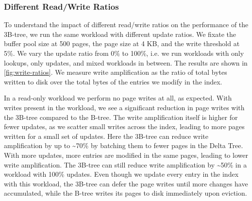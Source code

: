\subsubsection*{Different Read/Write Ratios}
To understand the impact of different read/write ratios on the performance of the 3B-tree, we run the same workload with different update ratios.
We fixate the buffer pool size at 500 pages, the page size at 4 KB, and the write threshold at 5\%.
We vary the update ratio from 0\% to 100\%, i.e. we run workloads with only lookups, only updates, and mixed workloads in between.
The results are shown in \autoref{fig:write-ratios}.
We measure write amplification as the ratio of total bytes written to disk over the total bytes of the entries we modify in the index.

In a read-only workload we perform no page writes at all, as expected.
With writes present in the workload, we see a significant reduction in page writes with the 3B-tree compared to the B-tree.
The write amplification itself is higher for fewer updates, as we scatter small writes across the index, leading to more pages written for a small set of updates.
Here the 3B-tree can reduce write amplification by up to \textasciitilde70\% by batching them to fewer pages in the Delta Tree.
With more updates, more entries are modified in the same pages, leading to lower write amplification.
The 3B-tree can still reduce write amplification by \textasciitilde50\% in a workload with 100\% updates.
Even though we update every entry in the index with this workload, the 3B-tree can defer the page writes until more changes have accumulated, while the B-tree writes its pages to disk immediately upon eviction.

